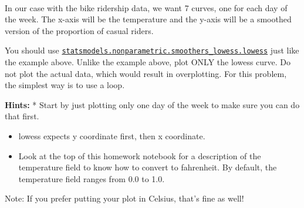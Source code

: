\documentclass[11pt]{article}
\begin{document}
    \begin{center}
    \end{center}
    { \hspace*{\fill} \\}
    
    In our case with the bike ridership data, we want 7 curves, one for each
day of the week. The x-axis will be the temperature and the y-axis will
be a smoothed version of the proportion of casual riders.

You should use
\href{http://www.statsmodels.org/dev/generated/statsmodels.nonparametric.smoothers_lowess.lowess.html}{\texttt{statsmodels.nonparametric.smoothers\_lowess.lowess}}
just like the example above. Unlike the example above, plot ONLY the
lowess curve. Do not plot the actual data, which would result in
overplotting. For this problem, the simplest way is to use a loop.

\textbf{Hints:} * Start by just plotting only one day of the week to
make sure you can do that first.

\begin{itemize}
\item
  lowess expects y coordinate first, then x coordinate.
\item
  Look at the top of this homework notebook for a description of the
  temperature field to know how to convert to fahrenheit. By default,
  the temperature field ranges from 0.0 to 1.0.
\end{itemize}

Note: If you prefer putting your plot in Celsius, that's fine as well!
\end{document}

